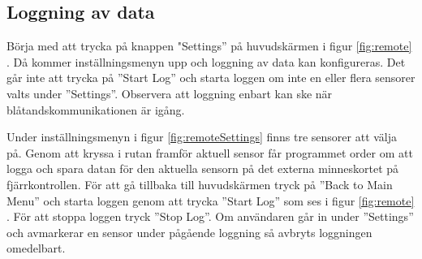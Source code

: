 \subsection{Loggning av data}
Börja med att trycka på knappen "Settings” på huvudskärmen i figur
\ref{fig:remote} . Då kommer inställningsmenyn upp och loggning av data kan
konfigureras. Det går inte att trycka på ”Start Log”  och starta loggen om inte
en eller flera sensorer valts under ”Settings”.
Observera att loggning enbart kan ske när blåtandskommunikationen är igång.

Under inställningsmenyn i figur \ref{fig:remoteSettings} finns tre sensorer att
välja på. Genom att kryssa i rutan framför aktuell sensor får programmet order
om att logga och spara datan för den aktuella sensorn på det externa
minneskortet på fjärrkontrollen. För att gå tillbaka till huvudskärmen tryck på
”Back to Main Menu” och starta loggen genom att trycka ”Start Log” som ses i
figur \ref{fig:remote} . För att stoppa loggen tryck ”Stop Log”. Om användaren
går in under ”Settings” och avmarkerar en sensor under pågående loggning så
avbryts loggningen omedelbart.